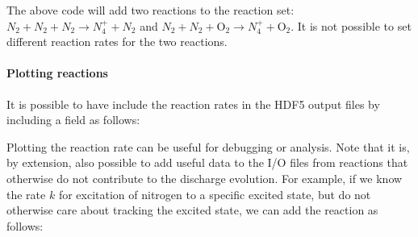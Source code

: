 \documentclass[letterpaper,10pt,english]{sphinxmanual}
\begin{document}
\sphinxAtStartPar
The above code will add two reactions to the reaction set: \(N_2 + N_2 + N_2 \rightarrow N_4^+ + N_2\) and \(N_2 + N_2 + \textrm{O}_2 \rightarrow N_4^+ + \textrm{O}_2\).
It is not possible to set different reaction rates for the two reactions.


\paragraph{Plotting reactions}
\label{\detokenize{Applications/CdrPlasmaModel:plotting-reactions}}
\sphinxAtStartPar
It is possible to have  include the reaction rates in the HDF5 output files by including a field  as follows:

\begin{sphinxVerbatim}[commandchars=\\\{\},formatcom=\scriptsize]
  \PYG{p}{[}
       
       
       
       
  \PYG{p}{]}
\end{sphinxVerbatim}

\sphinxAtStartPar
Plotting the reaction rate can be useful for debugging or analysis.
Note that it is, by extension, also possible to add useful data to the I/O files from reactions that otherwise do not contribute to the discharge evolution.
For example, if we know the rate \(k\) for excitation of nitrogen to a specific excited state, but do not otherwise care about tracking the excited state, we can add the reaction as follows:

\begin{sphinxVerbatim}[commandchars=\\\{\},formatcom=\scriptsize]
  \PYG{p}{[}
       
       
       
       
  \PYG{p}{]}
\end{sphinxVerbatim}
\end{document}
